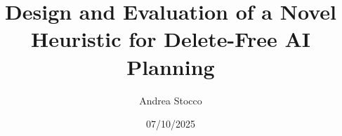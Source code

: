 \documentclass[12pt,a4paper,twoside,openright]{extreport}
\title{Design and Evaluation of a Novel Heuristic for Delete-Free AI Planning}
\author{Andrea Stocco}
\date{07/10/2025}
\theoremstyle{definition}
\begin{document}
\pagestyle{empty} %


\cleardoublepage


\cleardoublepage

\begin{abstract}
	
\end{abstract}
\cleardoublepage

\pagestyle{plain} %

\tableofcontents
\cleardoublepage

\listoffigures
\cleardoublepage %

\listoftables
\cleardoublepage

\listofalgorithms
\cleardoublepage



\cleardoublepage


\cleardoublepage


\cleardoublepage


\cleardoublepage


\cleardoublepage

\nocite{planning-tutorial}
\printbibliography[heading=bibintoc]
\end{document}
